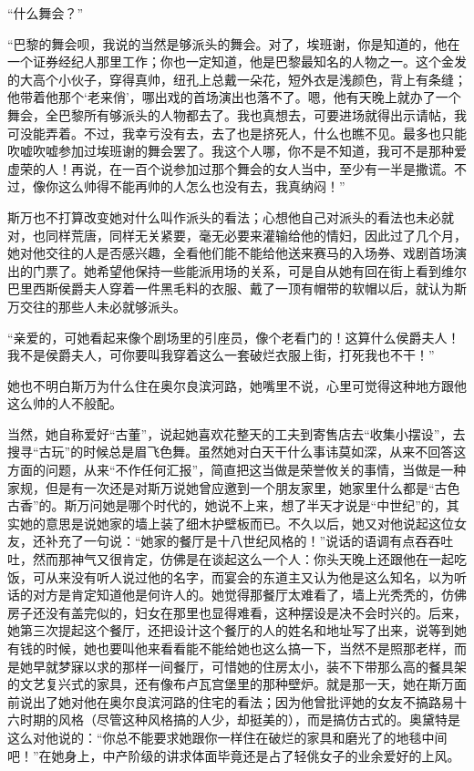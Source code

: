 \par “什么舞会？”
\par “巴黎的舞会呗，我说的当然是够派头的舞会。对了，埃班谢，你是知道的，他在一个证券经纪人那里工作；你也一定知道，他是巴黎最知名的人物之一。这个金发的大高个小伙子，穿得真帅，纽孔上总戴一朵花，短外衣是浅颜色，背上有条缝；他带着他那个‘老来俏’，哪出戏的首场演出也落不了。嗯，他有天晚上就办了一个舞会，全巴黎所有够派头的人物都去了。我也真想去，可要进场就得出示请帖，我可没能弄着。不过，我幸亏没有去，去了也是挤死人，什么也瞧不见。最多也只能吹嘘吹嘘参加过埃班谢的舞会罢了。我这个人哪，你不是不知道，我可不是那种爱虚荣的人！再说，在一百个说参加过那个舞会的女人当中，至少有一半是撒谎。不过，像你这么帅得不能再帅的人怎么也没有去，我真纳闷！”
\par 斯万也不打算改变她对什么叫作派头的看法；心想他自己对派头的看法也未必就对，也同样荒唐，同样无关紧要，毫无必要来灌输给他的情妇，因此过了几个月，她对他交往的人是否感兴趣，全看他们能不能给他送来赛马的入场券、戏剧首场演出的门票了。她希望他保持一些能派用场的关系，可是自从她有回在街上看到维尔巴里西斯侯爵夫人穿着一件黑毛料的衣服、戴了一顶有帽带的软帽以后，就认为斯万交往的那些人未必就够派头。
\par “亲爱的，可她看起来像个剧场里的引座员，像个老看门的！这算什么侯爵夫人！我不是侯爵夫人，可你要叫我穿着这么一套破烂衣服上街，打死我也不干！”
\par 她也不明白斯万为什么住在奥尔良滨河路，她嘴里不说，心里可觉得这种地方跟他这么帅的人不般配。
\par 当然，她自称爱好“古董”，说起她喜欢花整天的工夫到寄售店去“收集小摆设”，去搜寻“古玩”的时候总是眉飞色舞。虽然她对白天干什么事讳莫如深，从来不回答这方面的问题，从来“不作任何汇报”，简直把这当做是荣誉攸关的事情，当做是一种家规，但是有一次还是对斯万说她曾应邀到一个朋友家里，她家里什么都是“古色古香”的。斯万问她是哪个时代的，她说不上来，想了半天才说是“中世纪”的，其实她的意思是说她家的墙上装了细木护壁板而已。不久以后，她又对他说起这位女友，还补充了一句说：“她家的餐厅是十八世纪风格的！”说话的语调有点吞吞吐吐，然而那神气又很肯定，仿佛是在谈起这么一个人：你头天晚上还跟他在一起吃饭，可从来没有听人说过他的名字，而宴会的东道主又认为他是这么知名，以为听话的对方是肯定知道他是何许人的。她觉得那餐厅太难看了，墙上光秃秃的，仿佛房子还没有盖完似的，妇女在那里也显得难看，这种摆设是决不会时兴的。后来，她第三次提起这个餐厅，还把设计这个餐厅的人的姓名和地址写了出来，说等到她有钱的时候，她也要叫他来看看能不能给她也这么搞一下，当然不是照那老样，而是她早就梦寐以求的那样一间餐厅，可惜她的住房太小，装不下带那么高的餐具架的文艺复兴式的家具，还有像布卢瓦宫堡里的那种壁炉。就是那一天，她在斯万面前说出了她对他在奥尔良滨河路的住宅的看法；因为他曾批评她的女友不搞路易十六时期的风格（尽管这种风格搞的人少，却挺美的），而是搞仿古式的。奥黛特是这么对他说的：“你总不能要求她跟你一样住在破烂的家具和磨光了的地毯中间吧！”在她身上，中产阶级的讲求体面毕竟还是占了轻佻女子的业余爱好的上风。
